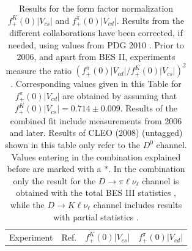 

\begin{table}[!htb]
\begin{center}
 \caption[]{Results for the form factor normalization
$f_+^K(0)|V_{cs}|$ and $f_+^{\pi}(0)|V_{cd}|$. Results from the
different collaborations have been corrected, if needed, using
values from PDG 2010 \cite{Nakamura:2010zzi}. Prior to 2006, and apart from BES II, experiments
measure the ratio $(f_+^{\pi}(0)|V_{cd}| / f_+^K(0)|V_{cs}|)^2$. 
Corresponding values given in this Table for $f_+^{\pi}(0)|V_{cd}|$
are obtained by assuming that $f_+^K(0)|V_{cs}|=0.714\pm 0.009$.
Results of the combined fit include measurements from 2006 and later. 
Results of CLEO (2008) (untagged) shown in this table only refer to the $D^0$ channel.
Values entering in the combination explained before are marked with a $\ast$. 
In the combination only the result for the $D \to \pi \ell \nu_\ell $ channel is obtained 
with the total BES III statistics \cite{BESIII-new}, while the $D \to K \ell \nu_\ell $ 
channel includes results with partial statistics \cite{BESIII}.
 \label{norma}}
\begin{tabular}{c c c c}
\vspace*{-10pt} & \\
\hline
Experiment & Ref. & $f_+^K(0)|V_{cs}|$ & $f_+^{\pi}(0)|V_{cd}|$ \\

\end{tabular}
\end{center}
\end{table}

